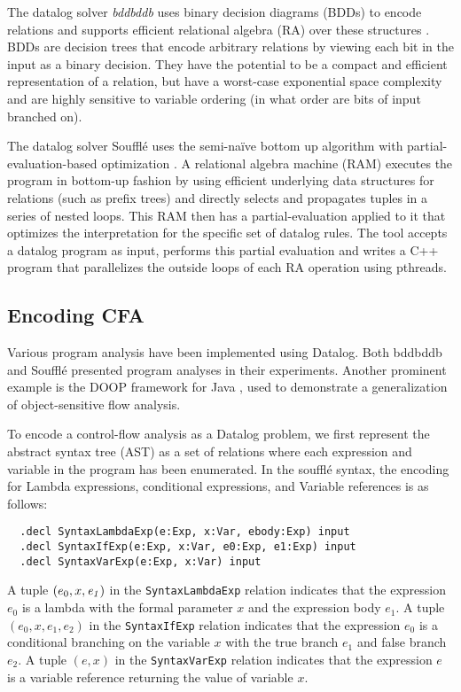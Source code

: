 The datalog solver \textit{bddbddb} uses binary decision diagrams (BDDs) to encode relations and supports
efficient relational algebra (RA) over these structures \cite{whaley:2005:bddbddb}.
%
BDDs are decision trees that encode arbitrary relations by viewing each bit in the input as a binary decision.
%
They have the potential to be a compact and efficient representation of a relation, but have a worst-case
exponential space complexity and are highly sensitive to variable ordering (in what order are bits of input
branched on).


The datalog solver Souffl\'e uses the semi-na\"ive bottom up algorithm with partial-evaluation-based optimization
\cite{scholz:2016:souffle}.
%
A relational algebra machine (RAM) executes the program in bottom-up fashion by using efficient underlying data
structures for relations (such as prefix trees) and directly selects and propagates tuples in a series of nested loops.
%
This RAM then has a partial-evaluation applied to it that optimizes the interpretation for the specific set of
datalog rules.
%
The tool accepts a datalog program as input, performs this partial evaluation and writes a C++ program that
parallelizes the outside loops of each RA operation using pthreads.



\subsection{Encoding CFA}
%
Various program analysis have been implemented using Datalog. Both bddbddb and Souffl\'e presented
program analyses in their experiments. Another prominent example is the DOOP framework for Java
\cite{smaragdakis:2011:pickyourcontexts}, used to demonstrate a generalization of object-sensitive flow analysis.


To encode a control-flow analysis as a Datalog problem, we first represent the abstract syntax tree (AST) as
a set of relations where each expression and variable in the program has been enumerated.
%
In the souffl\'e syntax, the encoding for Lambda expressions, conditional expressions, and Variable references is as follows:
%
\begin{Verbatim}
  .decl SyntaxLambdaExp(e:Exp, x:Var, ebody:Exp) input
  .decl SyntaxIfExp(e:Exp, x:Var, e0:Exp, e1:Exp) input
  .decl SyntaxVarExp(e:Exp, x:Var) input
\end{Verbatim}
%
A tuple $(e_0,x,\mathit{e_1})$ in the \texttt{SyntaxLambdaExp} relation indicates that the expression $e_0$ is a lambda
with the formal parameter $x$ and the expression body $e_1$. A tuple $(e_0,x,e_1,e_2)$ in the \texttt{SyntaxIfExp} relation
indicates that the expression $e_0$ is a conditional branching on the variable $x$ with the true branch $e_1$ and false
branch $e_2$. A tuple $(e,x)$ in the \texttt{SyntaxVarExp} relation indicates that the expression $e$ is a variable reference
returning the value of variable $x$.


